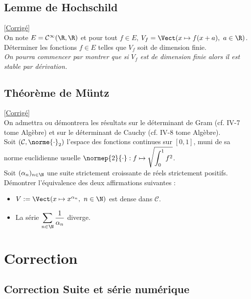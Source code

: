 \documentclass{book}
\begin{document}
\section{Lemme de Hochschild }
\textcolor{blue}{\hyperref[Lemme de Hochschild corrigé]{[Corrigé]}}\\
\label{Lemme de Hochschild}
On note $E=\mathcal C^\infty(\R,\R)$ et pour tout $f\in E$, $V_f=\Vect(x\mapsto f(x+a),\ a\in \R)$.
Déterminer les fonctions $f\in E$ telles que $V_f$ soit de dimension finie.\\
\textit{On pourra commencer par montrer que si $V_f$ est de dimension finie alors il est stable par dérivation.}

\section{Théorème de Müntz }
\label{Théorème de Muntz}
\textcolor{blue}{\hyperref[sec:theoreme-de-muntz]{[Corrigé]}}\\
On admettra ou démontrera les résultats sur le déterminant de Gram (cf. IV-7 tome Algèbre) et sur le déterminant de Cauchy (cf. IV-8 tome Algèbre).\\
Soit $(\mathcal C,\norme{\cdot}_2)$ l'espace des fonctions continues sur $[0,1]$, muni de sa norme euclidienne usuelle $\normep{2}{\cdot}:f\mapsto\displaystyle\sqrt{\int_0^1f^2}$.\\
Soit $(\alpha_n)_{n\in \N}$ une suite strictement croissante de réels strictement positifs.\\
Démontrer l'équivalence des deux affirmations suivantes :
\begin{itemize}
	\item $V:=\Vect(x\mapsto x^{\alpha_n},\ n\in\N)$ est dense dans $\mathcal C$.
	\item La série $\displaystyle \sum_{n\in \N}\frac{1}{\alpha_n}$ diverge.
\end{itemize}


\chapter{Correction}

\section{Correction Suite et série numérique}
\end{document}
